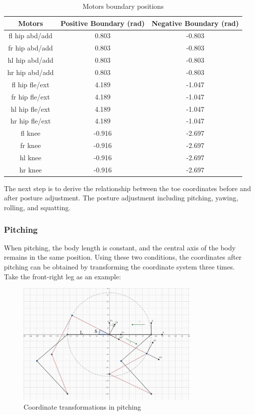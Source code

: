 \begin{table}[htbp]
   \centering
   \caption{Motors boundary positions}
   \begin{tabular}{|c|c|c|}
   \hline
   Motors & Positive Boundary (rad) & Negative Boundary (rad) \\ \hline
   fl hip abd/add &  0.803 & -0.803 \\ \hline
   fr hip abd/add &  0.803 & -0.803 \\ \hline
   hl hip abd/add &  0.803 & -0.803 \\ \hline
   hr hip abd/add &  0.803 & -0.803 \\ \hline
   fl hip fle/ext &  4.189 & -1.047 \\ \hline
   fr hip fle/ext &  4.189 & -1.047 \\ \hline
   hl hip fle/ext &  4.189 & -1.047 \\ \hline
   hr hip fle/ext &  4.189 & -1.047 \\ \hline
   fl knee        & -0.916 & -2.697 \\ \hline
   fr knee        & -0.916 & -2.697 \\ \hline
   hl knee        & -0.916 & -2.697 \\ \hline
   hr knee        & -0.916 & -2.697 \\ \hline
   \end{tabular}
   \label{table:motors_boundary_positions}
\end{table}

The next step is to derive the relationship between the toe coordinates before and after posture adjustment. The posture adjustment including pitching, yawing, rolling, and squatting.

\subsubsection{Pitching}

When pitching, the body length is constant, and the central axis of the body remains in the same position. Using these two conditions, the coordinates after pitching can be obtained by transforming the coordinate system three times. Take the front-right leg as an example:

\begin{figure}[htbp]
   \centering
   \includegraphics[width=0.8\textwidth]{figures/coordinate_transformations_in_pitching.jpg}
   \caption{Coordinate transformations in pitching}
   \label{fig:coordinate_transformations_in_pitching}
\end{figure}

